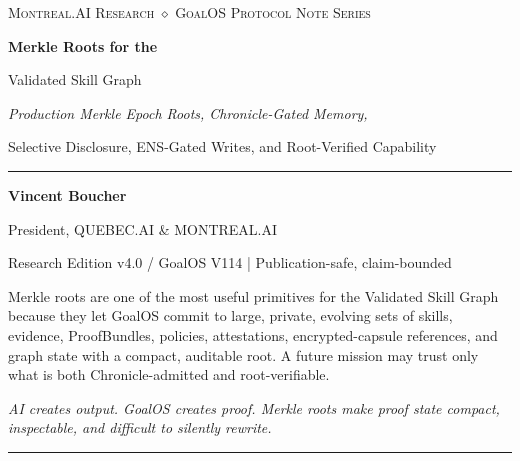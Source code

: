 \documentclass[11pt,letterpaper]{article}
\begin{document}
\begin{titlepage}
\thispagestyle{empty}
\begin{center}
\vspace*{0.55in}
{\small\scshape\color{Gold} Montreal.AI Research \quad $\diamond$ \quad GoalOS Protocol Note Series}\par
\vspace{0.9in}
{\fontsize{28}{31}\selectfont\bfseries\color{Navy} Merkle Roots for the\par Validated Skill Graph}\par
\vspace{0.22in}
{\large\itshape\color{MutedBlue} Production Merkle Epoch Roots, Chronicle-Gated Memory,\par Selective Disclosure, ENS-Gated Writes, and Root-Verified Capability}\par
\vspace{0.55in}
{\color{Gold}\rule{3.0in}{0.55pt}}\par
\vspace{0.42in}
{\Large\bfseries Vincent Boucher}\par
\vspace{0.07in}
{\large President, QUEBEC.AI \& MONTREAL.AI}\par
\vspace{0.34in}
{\small Research Edition v4.0 / GoalOS V114 \quad | \quad Publication-safe, claim-bounded}\par
\vfill
\begin{thesisbox}
Merkle roots are one of the most useful primitives for the Validated Skill Graph because they let GoalOS commit to large, private, evolving sets of skills, evidence, ProofBundles, policies, attestations, encrypted-capsule references, and graph state with a compact, auditable root. A future mission may trust only what is both Chronicle-admitted and root-verifiable.
\end{thesisbox}
\vspace{0.2in}
{\itshape AI creates output. GoalOS creates proof. Merkle roots make proof state compact, inspectable, and difficult to silently rewrite.}\par
\vspace{0.45in}
{\color{SoftGold}\rule{\textwidth}{0.5pt}}\par
\end{center}
\end{titlepage}

\begingroup
\small
\setlength{\cftbeforesecskip}{2pt}
\setlength{\cftbeforesubsecskip}{0pt}
\tableofcontents
\endgroup
\newpage
\end{document}
